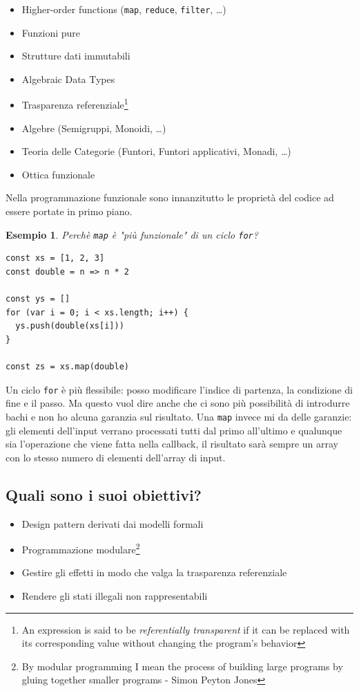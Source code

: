 \documentclass[12pt]{article}
\newtheorem{example}{Esempio}
\begin{document}
\begin{itemize}
  \item Higher-order functions (\texttt{map}, \texttt{reduce}, \texttt{filter},  \ldots)
  \item Funzioni pure
  \item Strutture dati immutabili
  \item Algebraic Data Types
  \item Trasparenza referenziale\footnote{An expression is said to be \emph{referentially transparent} if it can be replaced with its corresponding value without changing the program's behavior}
  \item Algebre (Semigruppi, Monoidi, \ldots)
  \item Teoria delle Categorie (Funtori, Funtori applicativi, Monadi, \ldots)
  \item Ottica funzionale
\end{itemize}

Nella programmazione funzionale sono innanzitutto le proprietà del codice ad essere portate in primo piano.

\begin{example}
Perchè \texttt{map} è "più funzionale" di un ciclo \texttt{for}?

\begin{verbatim}
const xs = [1, 2, 3]
const double = n => n * 2

const ys = []
for (var i = 0; i < xs.length; i++) {
  ys.push(double(xs[i]))
}

const zs = xs.map(double)
\end{verbatim}

\end{example}

Un ciclo \texttt{for} è più flessibile: posso modificare l'indice di partenza, la condizione di fine e il passo.
Ma questo vuol dire anche che ci sono più possibilità di introdurre bachi e non ho alcuna garanzia sul risultato.
Una \texttt{map} invece mi da delle garanzie: gli elementi dell'input verrano processati tutti dal primo all'ultimo e
qualunque sia l'operazione che viene fatta nella callback, il risultato sarà sempre un array con lo stesso numero di elementi
dell'array di input.

\subsection{Quali sono i suoi obiettivi?}

\begin{itemize}
  \item Design pattern derivati dai modelli formali
  \item Programmazione modulare\footnote{By modular programming I mean the process of building large programs by gluing together smaller programs - Simon Peyton Jones}
  \item Gestire gli effetti in modo che valga la trasparenza referenziale
  \item Rendere gli stati illegali non rappresentabili
\end{itemize}
\end{document}
